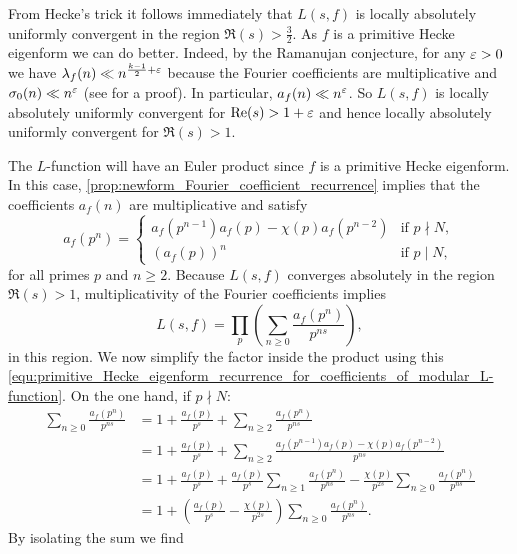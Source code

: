       From Hecke's trick it follows immediately that $L(s,f)$ is locally absolutely uniformly convergent in the region $\Re(s) > \frac{3}{2}$. As $f$ is a primitive Hecke eigenform we can do better. Indeed, by the Ramanujan conjecture, for any $\varepsilon > 0$ we have $\lambda_{f}(n) \ll n^{\frac{k-1}{2}+\varepsilon}$ because the Fourier coefficients are multiplicative and $\sigma_{0}(n) \ll n^{\varepsilon}$ (see \cite{montgomery2007multiplicative} for a proof). In particular, $a_{f}(n) \ll n^{\varepsilon}$. So $L(s,f)$ is locally absolutely uniformly convergent for $\mathrm{Re}(s) > 1+\varepsilon$ and hence locally absolutely uniformly convergent for $\Re(s) > 1$.

      The $L$-function will have an Euler product since $f$ is a primitive Hecke eigenform. In this case, \cref{prop:newform_Fourier_coefficient_recurrence} implies that the coefficients $a_{f}(n)$ are multiplicative and satisfy
      \begin{equation}\label{equ:primitive_Hecke_eigenform_recurrence_for_coefficients_of_modular_L-function}
        a_{f}(p^{n}) = \begin{cases} a_{f}(p^{n-1})a_{f}(p)-\chi(p)a_{f}(p^{n-2}) & \text{if $p \nmid N$}, \\ (a_{f}(p))^{n} & \text{if $p \mid N$}, \end{cases}
      \end{equation}
      for all primes $p$ and $n \ge 2$. Because $L(s,f)$ converges absolutely in the region $\Re(s) > 1$, multiplicativity of the Fourier coefficients implies
      \[
        L(s,f) = \prod_{p}\left(\sum_{n \ge 0}\frac{a_{f}(p^{n})}{p^{ns}}\right),
      \]
      in this region. We now simplify the factor inside the product using this \cref{equ:primitive_Hecke_eigenform_recurrence_for_coefficients_of_modular_L-function}. On the one hand, if $p \nmid N$:
      \begin{align*}
        \sum_{n \ge 0}\frac{a_{f}(p^{n})}{p^{ns}} &= 1+\frac{a_{f}(p)}{p^{s}}+\sum_{n \ge 2}\frac{a_{f}(p^{n})}{p^{ns}} \\
        &= 1+\frac{a_{f}(p)}{p^{s}}+\sum_{n \ge 2}\frac{a_{f}(p^{n-1})a_{f}(p)-\chi(p)a_{f}(p^{n-2})}{p^{ns}} \\
        &= 1+\frac{a_{f}(p)}{p^{s}}+\frac{a_{f}(p)}{p^{s}}\sum_{n \ge 1}\frac{a_{f}(p^{n})}{p^{ns}}-\frac{\chi(p)}{p^{2s}}\sum_{n \ge 0}\frac{a_{f}(p^{n})}{p^{ns}} \\
        &= 1+\left(\frac{a_{f}(p)}{p^{s}}-\frac{\chi(p)}{p^{2s}}\right)\sum_{n \ge 0}\frac{a_{f}(p^{n})}{p^{ns}}.
      \end{align*}
      By isolating the sum we find
